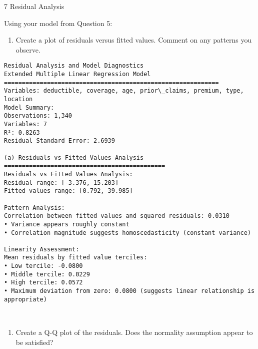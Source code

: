 \documentclass[8pt, twocolumn]{extarticle}
\providecommand{\tightlist}{%
      \setlength{\itemsep}{0pt}\setlength{\parskip}{0pt}}
\begin{document}
    7 Residual Analysis

Using your model from Question 5:

    \begin{enumerate}
\def\labelenumi{(\alph{enumi})}
\tightlist
\item
  Create a plot of residuals versus fitted values. Comment on any
  patterns you observe.
\end{enumerate}

    \begin{Verbatim}[commandchars=\\\{\}]
Residual Analysis and Model Diagnostics
Extended Multiple Linear Regression Model
============================================================
Variables: deductible, coverage, age, prior\_claims, premium, type, location
Model Summary:
Observations: 1,340
Variables: 7
R²: 0.8263
Residual Standard Error: 2.6939

(a) Residuals vs Fitted Values Analysis
=============================================
Residuals vs Fitted Values Analysis:
Residual range: [-3.376, 15.203]
Fitted values range: [0.792, 39.985]

Pattern Analysis:
Correlation between fitted values and squared residuals: 0.0310
• Variance appears roughly constant
• Correlation magnitude suggests homoscedasticity (constant variance)

Linearity Assessment:
Mean residuals by fitted value terciles:
• Low tercile: -0.0800
• Middle tercile: 0.0229
• High tercile: 0.0572
• Maximum deviation from zero: 0.0800 (suggests linear relationship is
appropriate)
    \end{Verbatim}

    \begin{center}
    \end{center}
    { \hspace*{\fill} \\}
    
    \begin{enumerate}
\def\labelenumi{(\alph{enumi})}
\setcounter{enumi}{1}
\tightlist
\item
  Create a Q-Q plot of the residuals. Does the normality assumption
  appear to be satisfied?
\end{enumerate}
\end{document}
